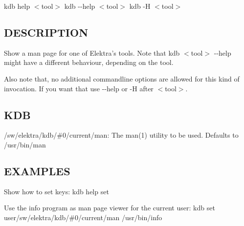{\ttfamily kdb help $<$tool$>$} {\ttfamily kdb -\/-\/help $<$tool$>$} {\ttfamily kdb -\/\+H $<$tool$>$}

\subsection*{D\+E\+S\+C\+R\+I\+P\+T\+I\+O\+N}

Show a man page for one of Elektra's tools. Note that {\ttfamily kdb $<$tool$>$ -\/-\/help} might have a different behaviour, depending on the tool.

Also note that, no additional commandline options are allowed for this kind of invocation. If you want that use {\ttfamily -\/-\/help} or {\ttfamily -\/\+H} after {\ttfamily $<$tool$>$}.

\subsection*{K\+D\+B}


\begin{DoxyItemize}
\item {\ttfamily /sw/elektra/kdb/\#0/current/man}\+: The man(1) utility to be used. Defaults to /usr/bin/man
\end{DoxyItemize}

\subsection*{E\+X\+A\+M\+P\+L\+E\+S}

Show how to set keys\+: {\ttfamily kdb help set}

Use the info program as man page viewer for the current user\+: {\ttfamily kdb set user/sw/elektra/kdb/\#0/current/man /usr/bin/info} 